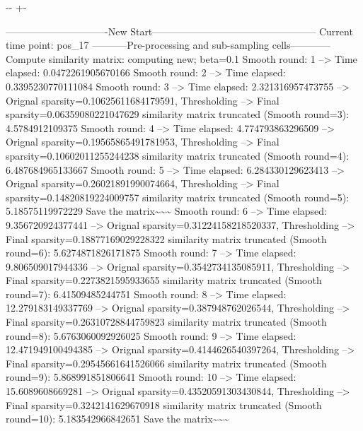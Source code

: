 \documentclass[letterpaper,10pt,english]{sphinxmanual}
\newlength\nbsphinxcodecellspacing
\begin{document}
{

\kern-\sphinxverbatimsmallskipamount\kern-\baselineskip
\kern+\FrameHeightAdjust\kern-\fboxrule
\vspace{\nbsphinxcodecellspacing}

\begin{sphinxVerbatim}[commandchars=\\\{\}]
-------------------------------New Start--------------------------------------------------
Current time point: pos\_17
-----------Pre-processing and sub-sampling cells------------
Compute similarity matrix: computing new; beta=0.1
Smooth round: 1
--> Time elapsed: 0.0472261905670166
Smooth round: 2
--> Time elapsed: 0.3395230770111084
Smooth round: 3
--> Time elapsed: 2.321316957473755
--> Orignal sparsity=0.10625611684179591, Thresholding
--> Final sparsity=0.06359080221047629
similarity matrix truncated (Smooth round=3):  4.5784912109375
Smooth round: 4
--> Time elapsed: 4.774793863296509
--> Orignal sparsity=0.19565865491781953, Thresholding
--> Final sparsity=0.10602011255244238
similarity matrix truncated (Smooth round=4):  6.487684965133667
Smooth round: 5
--> Time elapsed: 6.284330129623413
--> Orignal sparsity=0.26021891990074664, Thresholding
--> Final sparsity=0.14820819224009757
similarity matrix truncated (Smooth round=5):  5.18575119972229
Save the matrix\textasciitilde{}\textasciitilde{}\textasciitilde{}
Smooth round: 6
--> Time elapsed: 9.356720924377441
--> Orignal sparsity=0.31224158218520337, Thresholding
--> Final sparsity=0.18877169029228322
similarity matrix truncated (Smooth round=6):  5.6274871826171875
Smooth round: 7
--> Time elapsed: 9.806509017944336
--> Orignal sparsity=0.3542734135085911, Thresholding
--> Final sparsity=0.2273821595933655
similarity matrix truncated (Smooth round=7):  6.41509485244751
Smooth round: 8
--> Time elapsed: 12.279183149337769
--> Orignal sparsity=0.387948762026544, Thresholding
--> Final sparsity=0.26310728844759823
similarity matrix truncated (Smooth round=8):  5.6763060092926025
Smooth round: 9
--> Time elapsed: 12.471949100494385
--> Orignal sparsity=0.4144626540397264, Thresholding
--> Final sparsity=0.29545661641526066
similarity matrix truncated (Smooth round=9):  5.868991851806641
Smooth round: 10
--> Time elapsed: 15.6089608669281
--> Orignal sparsity=0.43520591303430844, Thresholding
--> Final sparsity=0.3242141629670918
similarity matrix truncated (Smooth round=10):  5.183542966842651
Save the matrix\textasciitilde{}\textasciitilde{}\textasciitilde{}

\end{sphinxVerbatim}}
\end{document}
